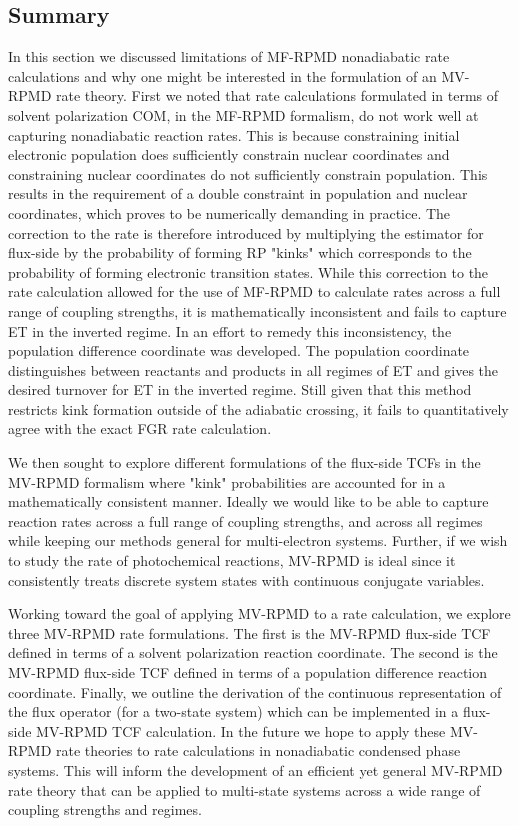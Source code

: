 \documentclass[phd,tocprelim]{cornell}
\begin{document}
\subsection{Summary}
In this section we discussed limitations of MF-RPMD nonadiabatic rate calculations and why one might be interested in the formulation of an MV-RPMD rate theory. First we noted that rate calculations formulated in terms of solvent polarization COM, in the MF-RPMD formalism, do not work well at capturing nonadiabatic reaction rates. This is because constraining initial electronic population does sufficiently constrain nuclear coordinates and constraining nuclear coordinates do not sufficiently constrain population. This results in the requirement of a double constraint in population and nuclear coordinates, which proves to be numerically demanding in practice. The correction to the rate is therefore introduced by multiplying the estimator for flux-side by the probability of forming RP "kinks" which corresponds to the probability of forming electronic transition states. While this correction to the rate calculation allowed for the use of MF-RPMD to calculate rates across a full range of coupling strengths, it is mathematically inconsistent and fails to capture ET in the inverted regime.
In an effort to remedy this inconsistency, the population difference coordinate was developed. The population coordinate distinguishes between reactants and products in all regimes of ET and gives the desired turnover for ET in the inverted regime. Still given that this method restricts kink formation outside of the adiabatic crossing, it fails to quantitatively agree with the exact FGR rate calculation.

We then sought to explore different formulations of the flux-side TCFs in the MV-RPMD formalism where "kink" probabilities are accounted for in a mathematically consistent manner. Ideally we would like to be able to capture reaction rates across a full range of coupling strengths, and across all regimes while keeping our methods general for multi-electron systems. Further, if we wish to study the rate of photochemical reactions, MV-RPMD is ideal since it consistently treats discrete system states with continuous conjugate variables.

Working toward the goal of applying MV-RPMD to a rate calculation, we explore three MV-RPMD rate formulations. The first is the MV-RPMD flux-side TCF defined in terms of a solvent polarization reaction coordinate. The second is the MV-RPMD flux-side TCF defined in terms of a population difference reaction coordinate. Finally, we outline the derivation of the continuous representation of the flux operator (for a two-state system) which can be implemented in a flux-side MV-RPMD TCF calculation. In the future we hope to apply these MV-RPMD rate theories to rate calculations in nonadiabatic condensed phase systems. This will inform the development of an efficient yet general MV-RPMD rate theory that can be applied to multi-state systems across a wide range of coupling strengths and regimes. 
\end{document}
